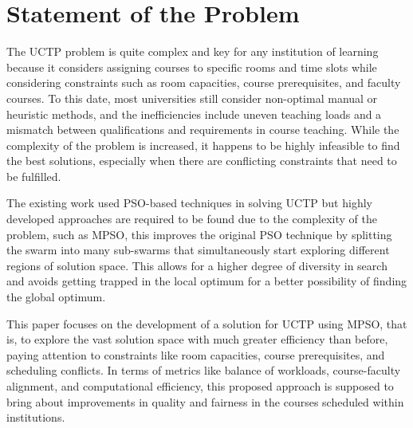 \section{Statement of the Problem}
\label{sec:problemstatement}

The UCTP problem is quite complex and key for any institution of learning because it considers assigning courses to specific rooms and time slots while considering constraints such as room capacities, course prerequisites, and faculty courses. \cite{Arratia-Martinez2021-io} To this date, most universities still consider non-optimal manual or heuristic methods, and the inefficiencies include uneven teaching loads and a mismatch between qualifications and requirements in course teaching. \cite{Oswald_C2013-zo} \cite{Gunawan2008-ga} While the complexity of the problem is increased, it happens to be highly infeasible to find the best solutions, especially when there are conflicting constraints that need to be fulfilled. 

The existing work \cite{Oswald_C2013-zo} \cite{Ali2014-mb} \cite{Chen2013-cp} used PSO-based techniques in solving UCTP but highly developed approaches are required to be found due to the complexity of the problem, such as MPSO, this improves the original PSO technique by splitting the swarm into many sub-swarms that simultaneously start exploring different regions of solution space. This allows for a higher degree of diversity in search and avoids getting trapped in the local optimum for a better possibility of finding the global optimum.

This paper focuses on the development of a solution for UCTP using MPSO, that is, to explore the vast solution space with much greater efficiency than before, paying attention to constraints like room capacities, course prerequisites, and scheduling conflicts. In terms of metrics like balance of workloads, course-faculty alignment, and computational efficiency, this proposed approach is supposed to bring about improvements in quality and fairness in the courses scheduled within institutions.
